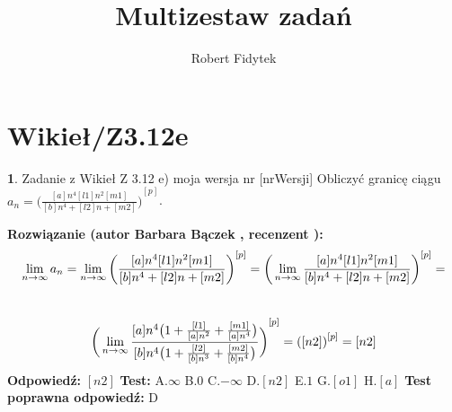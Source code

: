 \documentclass[12pt, a4paper]{article}
\title{Multizestaw zadań}
\author{Robert Fidytek}
\date{}
\theoremstyle{definition} %
\newtheorem{zad}{}
\newcommand{\kategoria}[1]{\section{#1}} %
\newcommand{\zadStart}[1]{\begin{zad}#1\newline} %
\newcommand{\zadStop}{\end{zad}}   %
\newcommand{\rozwStart}[2]{\noindent \textbf{Rozwiązanie (autor #1 , recenzent #2): }\newline} %
\newcommand{\rozwStop}{\newline}                                            %
\newcommand{\odpStart}{\noindent \textbf{Odpowiedź:}\newline}    %
\newcommand{\odpStop}{\newline}                                             %
\newcommand{\testStart}{\noindent \textbf{Test:}\newline} %
\newcommand{\testStop}{\newline} %
\newcommand{\kluczStart}{\noindent \textbf{Test poprawna odpowiedź:}\newline} %
\newcommand{\kluczStop}{\newline} %
\begin{document}
\maketitle


\kategoria{Wikieł/Z3.12e}
\zadStart{Zadanie z Wikieł Z 3.12 e) moja wersja nr [nrWersji]}
Obliczyć granicę ciągu $a_n={\big(\frac{[a]n^4 [l1]n^2 [m1]}{[b]n^4 + [l2]n +[m2]}\big)}^{[p]}$.
\zadStop
\rozwStart{Barbara Bączek}{}
$$\lim_{n \rightarrow \infty} a_n= \lim_{n \rightarrow \infty} {\bigg{(}\frac{[a]n^4 [l1]n^2 [m1]}{[b]n^4 + [l2]n +[m2]}\bigg{)}}^{[p]} = {\bigg{(}\lim_{n \rightarrow \infty} \frac{[a]n^4 [l1]n^2 [m1]}{[b]n^4 + [l2]n +[m2]}\bigg{)}}^{[p]}= $$\\ 
$${\bigg{(}\lim_{n \rightarrow \infty} \frac{[a]n^4\big( 1 + \frac{[l1]}{[a]n^2} + \frac{[m1]}{[a]n^4}\big{)}}{[b]n^4 \big(1 + \frac{[l2]}{[b]n^3} +\frac{[m2]}{[b]n^4}\big)}\bigg{)}}^{[p]}= {([n2])}^{[p]} =[n2]$$ 
\rozwStop
\odpStart
$[n2]$
\odpStop
\testStart
A.$\infty$
B.$0$
C.$-\infty$
D.$[n2]$
E.$1$
G.$[o1]$
H.$[a]$
\testStop
\kluczStart
D
\kluczStop
\end{document}
